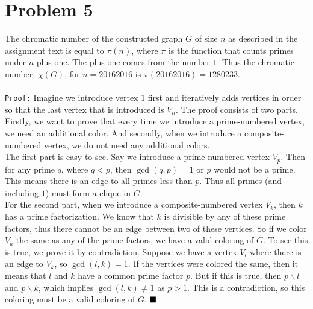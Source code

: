 \documentclass[a4paper]{article}
\begin{document}
\section{Problem 5}
The chromatic number of the constructed graph $G$ of size $n$ as described in the assignment text is equal to $\pi(n)$, where $\pi$ is the function that counts primes under $n$ plus one. The plus one comes from the number $1$. Thus the chromatic number, $\chi(G)$, for $n=20162016$ is $\pi(20162016)=1280233$. \\
\\
\texttt{Proof:} Imagine we introduce vertex $1$ first and iteratively adds vertices in order so that the last vertex that is introduced is $V_n$. The proof consists of two parts. Firstly, we want to prove that every time we introduce a prime-numbered vertex, we need an additional color. And secondly, when we introduce a composite-numbered vertex, we do not need any additional colors.\\
The first part is easy to see. Say we introduce a prime-numbered vertex $V_p$. Then for any prime $q$, where $q<p$, then $\gcd(q,p)=1$ or $p$ would not be a prime. This means there is an edge to all primes less than $p$. Thus all primes (and including $1$) must form a clique in $G$. \\
For the second part, when we introduce a composite-numbered vertex $V_k$, then $k$ has a prime factorization. We know that $k$ is divisible by any of these prime factors, thus there cannot be an edge between two of these vertices. So if we color $V_k$ the same as any of the prime factors, we have a valid coloring of $G$. To see this is true, we prove it by contradiction. Suppose we have a vertex $V_l$ where there is an edge to $V_k$, so $\gcd(l,k)=1$. If the vertices were colored the same, then it means that $l$ and $k$ have a common prime factor $p$. But if this is true, then $p\mathop \backslash l$ and $p\mathop \backslash k$, which implies $\gcd(l,k)\neq 1$ as $p>1$. This is a contradiction, so this coloring must be a valid coloring of $G$. $\hfill\blacksquare$
\end{document}
